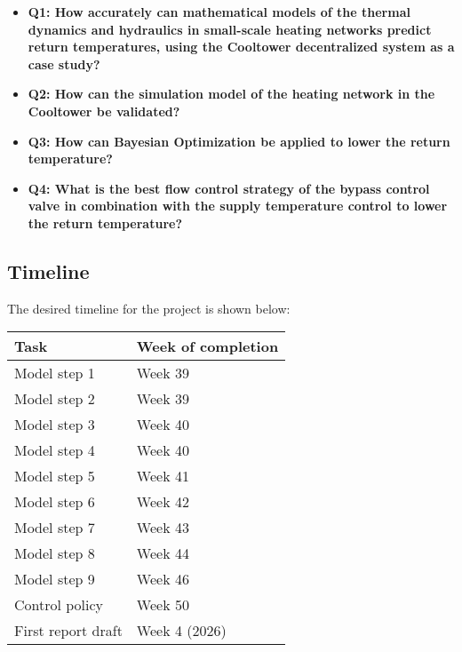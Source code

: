 \begin{itemize}
  \renewcommand\labelitemi{} %
    \item \textbf{Q1: How accurately can mathematical models of the thermal dynamics and hydraulics in small-scale heating networks predict return temperatures, using the Cooltower decentralized system as a case study?}
    \item \textbf{Q2: How can the simulation model of the heating network in the Cooltower be validated?}
    \item \textbf{Q3: How can Bayesian Optimization be applied to lower the return temperature?}
    \item \textbf{Q4: What is the best flow control strategy of the bypass control valve in combination with the supply temperature control to lower the return temperature?}  
    
\end{itemize}

\newpage

\subsection{Timeline}
The desired timeline for the project is shown below:

\begin{table}[h]
\center
\begin{tabular}{l|l}
Task           & Week of completion \\ \hline
Model step 1   & Week 39\footnotemark[1]           \\
Model step 2   & Week 39\footnotemark[1]            \\
Model step 3   & Week 40            \\
Model step 4   & Week 40            \\
Model step 5   & Week 41            \\
Model step 6   & Week 42            \\
Model step 7   & Week 43            \\
Model step 8   & Week 44            \\
Model step 9   & Week 46            \\
Control policy & Week 50           \\
First report draft & Week 4 (2026)
\end{tabular}
\end{table}
